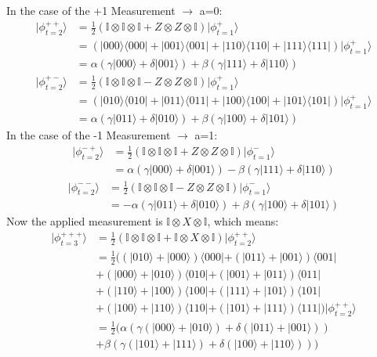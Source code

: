 In the case of the +1 Measurement $\rightarrow$ a=0:
\begin{align*}
	|\phi^{++}_{t=2}\rangle 
	&= \frac{1}{2}\left(\mathbb{I}\otimes\mathbb{I}\otimes\mathbb{I}+
	Z\otimes Z \otimes \mathbb{I}\right)|\phi^{+}_{t=1}\rangle\\
	&= (|000\rangle\langle000| +|001\rangle\langle001| +
	|110\rangle\langle110| +|111\rangle\langle111|)|\phi^{+}_{t=1}\rangle\\
	&= \alpha \left( \gamma |000\rangle + \delta |001\rangle \right)
	+ \beta \left( \gamma |111\rangle + \delta |110\rangle\right) 
\end{align*}
\begin{align*}
	|\phi^{+-}_{t=2}\rangle 
	&= \frac{1}{2}\left(\mathbb{I}\otimes\mathbb{I}\otimes\mathbb{I}-
	Z \otimes Z \otimes \mathbb{I}\right)|\phi^{+}_{t=1}\rangle\\
	&= (|010\rangle\langle010| +|011\rangle\langle011| +
	|100\rangle\langle100| +|101\rangle\langle101|)|\phi^{+}_{t=1}\rangle\\
	&= \alpha \left( \gamma |011\rangle + \delta |010\rangle \right)
	+ \beta \left( \gamma |100\rangle + \delta |101\rangle \right) 
\end{align*}
In the case of the -1 Measurement $\rightarrow$ a=1:
\begin{align*}
	|\phi^{-+}_{t=2}\rangle 
	&= \frac{1}{2}\left(\mathbb{I}\otimes\mathbb{I}\otimes\mathbb{I}+
	Z\otimes Z \otimes \mathbb{I}\right)|\phi^{-}_{t=1}\rangle\\
	&= \alpha \left( \gamma |000\rangle + \delta |001\rangle \right)
	- \beta \left( \gamma |111\rangle + \delta |110\rangle\right) 
\end{align*}
\begin{align*}
	|\phi^{--}_{t=2}\rangle 
	&= \frac{1}{2}\left(\mathbb{I}\otimes\mathbb{I}\otimes\mathbb{I}-
	Z\otimes Z \otimes \mathbb{I}\right)|\phi^{-}_{t=1}\rangle\\
	&= - \alpha \left( \gamma |011\rangle + \delta |010\rangle \right)
	+ \beta \left( \gamma |100\rangle + \delta |101\rangle \right) 
\end{align*}
Now the applied measurement is 
$\mathbb{I} \otimes X \otimes \mathbb{I}$, which means:
\begin{align*}
	|\phi^{+++}_{t=3}\rangle 
	&= \frac{1}{2}\left(\mathbb{I}\otimes\mathbb{I}\otimes\mathbb{I}+
	\mathbb{I}\otimes X \otimes \mathbb{I}\right)|\phi^{++}_{t=2}\rangle\\
	&= \frac{1}{2}((|010\rangle + |000\rangle)\langle000|
	+ (|011\rangle + |001\rangle)\langle001|\\
	&+ (|000\rangle + |010\rangle)\langle010|
	+ (|001\rangle + |011\rangle)\langle011|\\
	&+ (|110\rangle + |100\rangle)\langle100|
	+ (|111\rangle + |101\rangle)\langle101|\\
	&+ (|100\rangle + |110\rangle)\langle110|
	+ (|101\rangle + |111\rangle)\langle111|)
	|\phi^{++}_{t=2}\rangle\\
	&= \frac{1}{2}(\alpha \left( 
	\gamma (|000\rangle + |010\rangle)+
	\delta (|011\rangle + |001\rangle) \right) \\
	&+ \beta \left( 
	\gamma (|101\rangle + |111\rangle)+
	\delta (|100\rangle + |110\rangle) \right))
\end{align*}
